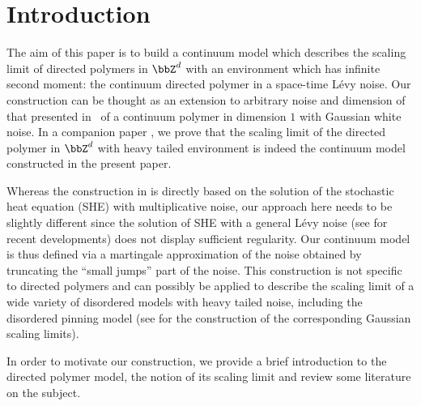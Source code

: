 \section{Introduction}

The aim of this paper is to build a continuum model which describes the scaling limit of directed polymers in $\bbZ^d$ with an environment which has infinite second moment:
the continuum directed polymer in a space-time Lévy noise.
Our construction can be thought as an extension to arbitrary noise and dimension of that presented in~\cite{AKQ14b} of a continuum polymer in dimension $1$ with Gaussian white noise.
In a companion paper \cite{BL20_disc}, we prove that the scaling limit of the directed polymer in $\bbZ^d$ with heavy tailed environment is indeed the continuum model constructed in the present paper.

Whereas the construction in \cite{AKQ14b} is directly based on the solution of the stochastic heat equation (SHE) with multiplicative noise, our approach here needs to be slightly different since the solution of SHE with a general Lévy noise (see \cite{Chong17} for recent developments) does not display sufficient regularity. Our continuum model is thus defined via a martingale approximation of the noise obtained by truncating the ``small jumps'' part of the noise. This construction is not specific to directed polymers and can possibly be applied to describe the scaling limit of a wide variety of disordered models with heavy tailed noise, including the disordered pinning model (see \cite{CSZ14,CSZ13} for the construction of the corresponding Gaussian scaling limits).

In order to motivate our construction, we provide a brief introduction to the directed polymer model, the notion of its scaling limit and review some literature on the subject.

\label{sec:discrete}

